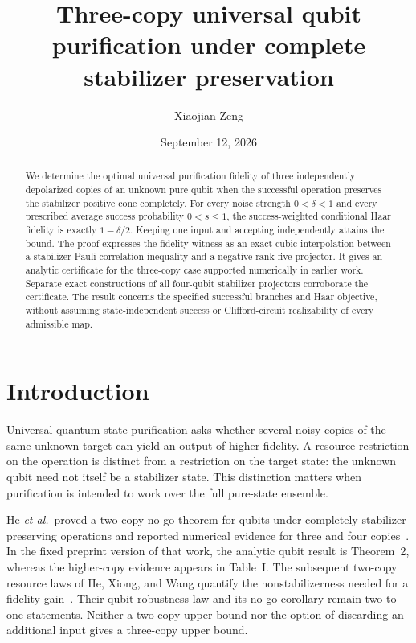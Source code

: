 \documentclass[aps,pra,reprint,amsmath,amssymb,longbibliography,nofootinbib]{revtex4-2}
\begin{document}
\title{Three-copy universal qubit purification under complete stabilizer preservation}
\author{Xiaojian Zeng}
\date{September 12, 2026}
\begin{abstract}
We determine the optimal universal purification fidelity of three independently depolarized copies of an unknown pure qubit when the successful operation preserves the stabilizer positive cone completely. For every noise strength $0<\delta<1$ and every prescribed average success probability $0<s\leq1$, the success-weighted conditional Haar fidelity is exactly $1-\delta/2$. Keeping one input and accepting independently attains the bound. The proof expresses the fidelity witness as an exact cubic interpolation between a stabilizer Pauli-correlation inequality and a negative rank-five projector. It gives an analytic certificate for the three-copy case supported numerically in earlier work. Separate exact constructions of all four-qubit stabilizer projectors corroborate the certificate. The result concerns the specified successful branches and Haar objective, without assuming state-independent success or Clifford-circuit realizability of every admissible map.
\end{abstract}
\maketitle

\section{Introduction}

Universal quantum state purification asks whether several noisy copies of the same unknown target can yield an output of higher fidelity. A resource restriction on the operation is distinct from a restriction on the target state: the unknown qubit need not itself be a stabilizer state. This distinction matters when purification is intended to work over the full pure-state ensemble.

He \emph{et al.}\ proved a two-copy no-go theorem for qubits under completely stabilizer-preserving operations and reported numerical evidence for three and four copies~\cite{He2025NoGo}. In the fixed preprint version of that work, the analytic qubit result is Theorem~2, whereas the higher-copy evidence appears in Table~I. The subsequent two-copy resource laws of He, Xiong, and Wang quantify the nonstabilizerness needed for a fidelity gain~\cite{He2026Resource}. Their qubit robustness law and its no-go corollary remain two-to-one statements. Neither a two-copy upper bound nor the option of discarding an additional input gives a three-copy upper bound.
\end{document}
